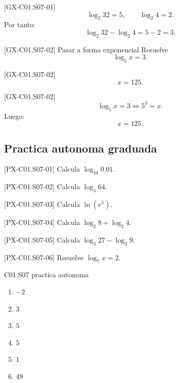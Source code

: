 \begin{fullsolution}{[GX-C01.S07-01]}
\[
\log_2 32=5,\qquad \log_2 4=2.
\]
Por tanto:
\[
\log_2 32-\log_2 4=5-2=3.
\]
\end{fullsolution}

\begin{guidedexercise}{[GX-C01.S07-02] Pasar a forma exponencial}
Resuelve
\[
\log_5 x=3.
\]
\end{guidedexercise}

\begin{shortanswer}{[GX-C01.S07-02]}
\[
x=125.
\]
\end{shortanswer}

\begin{fullsolution}{[GX-C01.S07-02]}
\[
\log_5 x=3 \Longleftrightarrow 5^3=x.
\]
Luego:
\[
x=125.
\]
\end{fullsolution}

\subsection*{Practica autonoma graduada}
\begin{exercise}{[PX-C01.S07-01] Calcula \(\log_{10}0.01\).}
\end{exercise}
\begin{exercise}{[PX-C01.S07-02] Calcula \(\log_4 64\).}
\end{exercise}
\begin{exercise}{[PX-C01.S07-03] Calcula \(\ln(e^5)\).}
\end{exercise}
\begin{exercise}{[PX-C01.S07-04] Calcula \(\log_2 8+\log_2 4\).}
\end{exercise}
\begin{exercise}{[PX-C01.S07-05] Calcula \(\log_3 27-\log_3 9\).}
\end{exercise}
\begin{exercise}{[PX-C01.S07-06] Resuelve \(\log_7 x=2\).}
\end{exercise}

\begin{shortanswer}{C01.S07 practica autonoma}
\begin{enumerate}[label=\textbf{PX-C01.S07-\arabic*:}, leftmargin=*]
  \item \(-2\)
  \item \(3\)
  \item \(5\)
  \item \(5\)
  \item \(1\)
  \item \(49\)
\end{enumerate}
\end{shortanswer}

